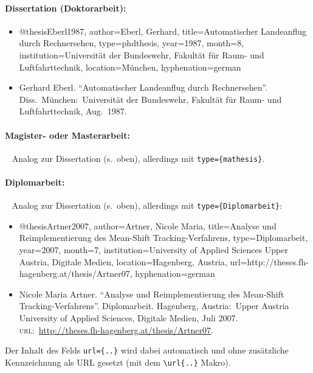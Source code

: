 \paragraph{Dissertation (Doktorarbeit):}
\begin{itemize}
\item[]
\begin{GenericCode}[numbers=none]
@thesis{Eberl1987,
	author={Eberl, Gerhard},
	title={Automatischer Landeanflug durch Rechnersehen},
	type={phdthesis},
	year={1987},
	month={8},
	institution={Universität der Bundeswehr, Fakultät für Raum- und Luftfahrttechnik},
	location={München},
	hyphenation={german}
}
\end{GenericCode}
\item[\cite{Eberl1987}]
Gerhard Eberl. "`Automatischer Landeanflug durch Rechnersehen"'.
Diss.\ München:\ Universität der Bundeswehr, Fakultät für Raum- und
Luftfahrttechnik, Aug.\ 1987.
\end{itemize}

\paragraph{Magister- oder Masterarbeit:} ~ \newline
Analog zur Dissertation (s.\ oben), allerdings mit \texttt{type=\{mathesis\}}.%


\paragraph{Diplomarbeit:} ~ \newline
Analog zur Dissertation (s.\ oben), allerdings mit \texttt{type=\obnh\{Diplomarbeit\}}:%
%
\begin{itemize}
\item[]
\begin{GenericCode}[numbers=none]
@thesis{Artner2007,
	author={Artner, Nicole Maria},
	title={Analyse und Reimplementierung des Mean-Shift Tracking-Verfahrens},
	type={Diplomarbeit},
	year={2007},
	month={7},
	institution={University of Applied Sciences Upper Austria, Digitale Medien},
	location={Hagenberg, Austria},
	url={http://theses.fh-hagenberg.at/thesis/Artner07},
  hyphenation={german}
}
\end{GenericCode}
\item[\cite{Artner2007}]
Nicole Maria Artner. "`Analyse und Reimplementierung des Mean-Shift
Tracking-Verfahrens"'. Diplomarbeit. Hagenberg, Austria:\ Upper 
Austria University of Applied Sciences, Digitale Medien, Juli 2007. 
\textsc{url}:\ \url{http://theses.fh-hagenberg.at/thesis/Artner07}.
\end{itemize}
%
Der Inhalt des Felds \verb!url={..}! wird dabei automatisch und ohne zusätzliche
Kennzeichnung als URL gesetzt (mit dem \verb!\url{..}! Makro).

